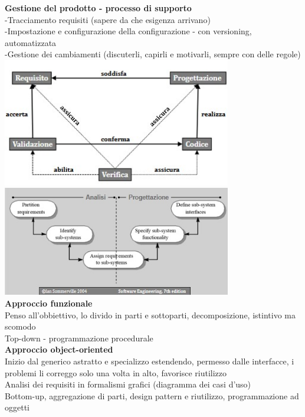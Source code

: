 \documentclass{article}
\begin{document}
		\textbf{Gestione del prodotto - processo di supporto}\\
		-Tracciamento requisiti (sapere da che esigenza arrivano)\\
		-Impostazione e configurazione della configurazione - con versioning, automatizzata\\
		-Gestione dei cambiamenti (discuterli, capirli e motivarli, sempre con delle regole)\\
		\includegraphics[width=10cm]{verifica.jpg}\\
		\includegraphics[width=10cm]{analisi_progettazione.jpg}\\
		
		\textbf{Approccio funzionale}\\
		Penso all'obbiettivo, lo divido in parti e sottoparti, decomposizione, istintivo ma scomodo\\
		Top-down - programmazione procedurale\\
		
		\textbf{Approccio object-oriented}\\
		Inizio dal generico astratto e specializzo estendendo, permesso dalle interfacce, i problemi li correggo solo una volta in alto, favorisce riutilizzo\\
		Analisi dei requisiti in formalismi grafici (diagramma dei casi d'uso)\\
		Bottom-up, aggregazione di parti, design pattern e riutilizzo, programmazione ad oggetti\\
		
\end{document}
